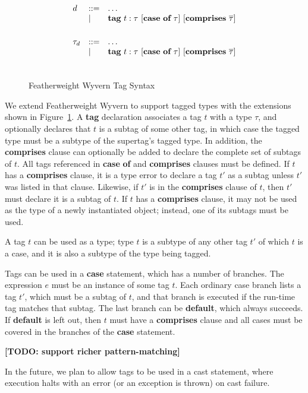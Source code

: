 \documentclass[11pt]{article}
\newcommand{\TODO}[1]{\textbf{[TODO: #1]}}
\newcommand{\keyw}[1]{\textbf{#1}}
\begin{document}
\begin{sloppypar}
\begin{figure}
\[\begin{array}{lll}
d    & \bnfdef & \ldots\\
     & \bnfalt & \keyw{tag}~ t:\tau ~ [\keyw{case}~\keyw{of}~\tau] ~ [\keyw{comprises}~ \overline{\tau}] \\
\\[1ex]

\tau_d & \bnfdef & \ldots \\
       & \bnfalt & \keyw{tag}~ t:\tau ~ [\keyw{case}~\keyw{of}~\tau] ~ [\keyw{comprises}~ \overline{\tau}] \\
\\[1ex]

\end{array}
\]
\caption{Featherweight Wyvern Tag Syntax}
\label{fig:tag-syntax}
\end{figure}

We extend Featherweight Wyvern to support tagged types with the extensions shown in Figure~\ref{fig:tag-syntax}.  A \keyw{tag} declaration associates a tag $t$ with a type $\tau$, and optionally declares that $t$ is a subtag of some other tag, in which case the tagged type must be a subtype of the supertag's tagged type.  In addition, the \keyw{comprises} clause can optionally be added to declare the complete set of subtags of $t$.  All tags referenced in \keyw{case} \keyw{of} and \keyw{comprises} clauses must be defined.  If $t$ has a \keyw{comprises} clause, it is a type error to declare a tag $t'$ as a subtag unless $t'$ was listed in that clause.  Likewise, if $t'$ is in the \keyw{comprises} clause of $t$, then $t'$ must declare it is a subtag of $t$.  If $t$ has a \keyw{comprises} clause, it may not be used as the type of a newly instantiated object; instead, one of its subtags must be used.

A tag $t$ can be used as a type; type $t$ is a subtype of any other tag $t'$ of which $t$ is a case, and it is also a subtype of the type being tagged.

Tags can be used in a \keyw{case} statement, which has a number of branches.  The expression $e$ must be an instance of some tag $t$.  Each ordinary case branch lists a tag $t'$, which must be a subtag of $t$, and that branch is executed if the run-time tag matches that subtag.  The last branch can be \keyw{default}, which always succeeds.  If \keyw{default} is left out, then $t$ must have a \keyw{comprises} clause and all cases must be covered in the branches of the \keyw{case} statement.

\TODO{support richer pattern-matching}

In the future, we plan to allow tags to be used in a cast statement, where execution halts with an error (or an exception is thrown) on cast failure.


\end{sloppypar}
\end{document}
